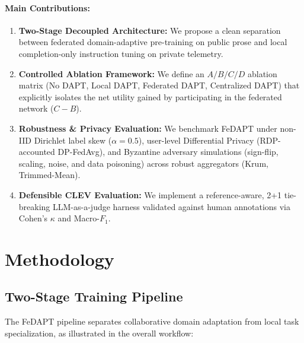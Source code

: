 \documentclass[11pt,a4paper]{article}
\begin{document}
\paragraph{Main Contributions:}
\begin{enumerate}
    \item \textbf{Two-Stage Decoupled Architecture:} We propose a clean separation between federated domain-adaptive pre-training on public prose and local completion-only instruction tuning on private telemetry.
    \item \textbf{Controlled Ablation Framework:} We define an $A/B/C/D$ ablation matrix (No DAPT, Local DAPT, Federated DAPT, Centralized DAPT) that explicitly isolates the net utility gained by participating in the federated network ($C - B$).
    \item \textbf{Robustness \& Privacy Evaluation:} We benchmark FeDAPT under non-IID Dirichlet label skew ($\alpha=0.5$), user-level Differential Privacy (RDP-accounted DP-FedAvg), and Byzantine adversary simulations (sign-flip, scaling, noise, and data poisoning) across robust aggregators (Krum, Trimmed-Mean).
    \item \textbf{Defensible CLEV Evaluation:} We implement a reference-aware, 2+1 tie-breaking LLM-as-a-judge harness validated against human annotations via Cohen's $\kappa$ and Macro-$F_1$.
\end{enumerate}

\section{Methodology}

\subsection{Two-Stage Training Pipeline}
The FeDAPT pipeline separates collaborative domain adaptation from local task specialization, as illustrated in the overall workflow:
\end{document}
